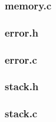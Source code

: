 \documentclass[a4paper,10pt,titlepage]{report}
\begin{document}
\subsubsection{memory.c}


\subsubsection{error.h}


\subsubsection{error.c}


\subsubsection{stack.h}


\subsubsection{stack.c}

\end{document}

